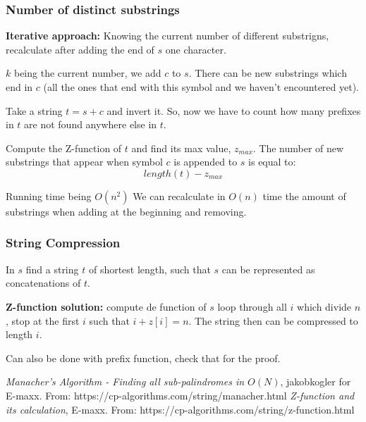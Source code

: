 \documentclass{IEEEtran}
\begin{document}
      \subsubsection{Number of distinct substrings}
        \textbf{Iterative approach:} Knowing the current number of different substrigns, recalculate after adding the end of $s$ one character.\par 
        $k$ being the current number, we add $c$ to $s$. There can be new substrings which end in $c$ (all the ones that end with this symbol and we haven't encountered yet).\par 
        Take a string $t=s+c$ and invert it. So, now we have to count how many prefixes in $t$ are not found anywhere else in $t$.\par 
        Compute the Z-function of $t$ and find its max value, $z_{max}$. The number of new substrings that appear when symbol $c$ is appended to $s$ is equal to:
        $$length(t)-z_{max}$$
        \par Running time being $O(n^2)$
        We can recalculate in $O(n)$ time the amount of substrings when adding at the beginning and removing.
      \subsubsection{String Compression}
        In $s$ find a string $t$ of shortest length, such that $s$ can be represented as concatenations of $t$.\par 
        \textbf{Z-function solution:} compute de function of $s$ loop through all $i$ which divide $n$, stop at the first $i$ such that $i+z[i]=n$. The string then can be compressed to length $i$.\par 
        Can also be done with prefix function, check that for the proof. 
  \begin{thebibliography}{}
      \textit{Manacher's Algorithm - Finding all sub-palindromes in $O(N)$},
      jakobkogler for E-maxx.
      From: https://cp-algorithms.com/string/manacher.html
      \textit{Z-function and its calculation},
      E-maxx.
      From: https://cp-algorithms.com/string/z-function.html
  \end{thebibliography}
\end{document}
